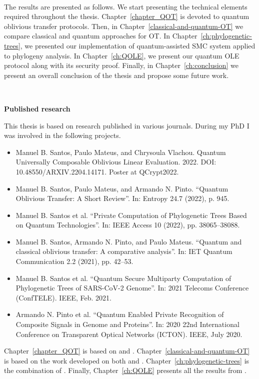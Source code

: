 \

The results are presented as follows. We start presenting the technical elements required throughout the thesis. Chapter~\ref{chapter_QOT} is devoted to quantum oblivious transfer protocols. Then, in Chapter~\ref{classical-and-quantum-OT} we compare classical and quantum approaches for OT. In Chapter~\ref{ch:phylogenetic-trees}, we presented our implementation of quantum-assisted SMC system applied to phylogeny analysis. In Chapter~\ref{ch:QOLE}, we present our quantum OLE protocol along with its security proof. Finally, in Chapter~\ref{ch:conclusion} we present an overall conclusion of the thesis and propose some future work.


\

\noindent\textbf{Published research}

This thesis is based on research published in various journals. During my PhD I was involved in the following projects.

\begin{itemize}
	\item\cite{SMV22} Manuel B. Santos, Paulo Mateus, and Chrysoula Vlachou. Quantum Universally
Composable Oblivious Linear Evaluation. 2022. DOI: 10.48550/ARXIV.2204.14171. Poster at QCrypt2022.	
	
	\item\cite{SMP22} Manuel B. Santos, Paulo Mateus, and Armando N. Pinto. “Quantum Oblivious Transfer:
A Short Review”. In: Entropy 24.7 (2022), p. 945.

	\item\cite{SGPM22} Manuel B. Santos et al. “Private Computation of Phylogenetic Trees Based on Quantum
Technologies”. In: IEEE Access 10 (2022), pp. 38065–38088.

	\item\cite{SPM21} Manuel B. Santos, Armando N. Pinto, and Paulo Mateus. “Quantum and classical
oblivious transfer: A comparative analysis”. In: IET Quantum Communication 2.2 (2021), pp. 42–53.

	\item\cite{SGPM21} Manuel B. Santos et al. “Quantum Secure Multiparty Computation of Phylogenetic Trees of SARS-CoV-2 Genome”. In: 2021 Telecoms Conference (ConfTELE). IEEE, Feb. 2021.

    \item\cite{POS+20} Armando N. Pinto et al. “Quantum Enabled Private Recognition of Composite Signals
in Genome and Proteins”. In: 2020 22nd International Conference on Transparent Optical
Networks (ICTON). IEEE, July 2020. 
\end{itemize}

Chapter~\ref{chapter_QOT} is based on \cite{SMP22} and \cite{SGPM22}. Chapter~\ref{classical-and-quantum-OT} is based on the work developed on both \cite{SPM21} and \cite{SGPM22}. Chapter~\ref{ch:phylogenetic-trees} is the combination of \cite{SGPM22, SGPM21, POS+20}. Finally, Chapter~\ref{ch:QOLE} presents all the results from \cite{SMV22}. 

%
%
%
